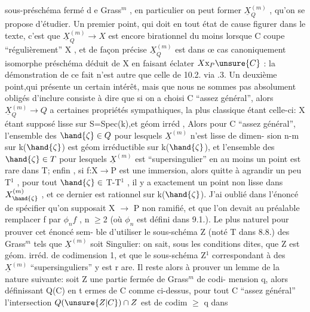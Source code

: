 
sous-préschéma fermé d e Grass$^{m}$ , en particulier on peut former $\underline{X}^{(m)}_{Q}$ ,
qu'on se propose d'étudier. Un premier point, qui doit en tout état de
cause figurer dans le texte, c'est que $\underline{X}^{(m)}_{Q} \longrightarrow X$ est encore birationnel
du moins lorsque C coupe ``régulièrement'' X , et de façon précise $\underline{X}^{(m)}_{Q}$
est dans œ cas canoniquement isomorphe  préschéma déduit de X en
faisant éclater $X\mathrm{x}_{P}\unsure{C}$ : la démonstration de ce fait n'est autre que celle
de 10.2. via .3. Un deuxième point,qui présente un certain intérêt,
mais que nous ne sommes pas absolument obligés d'inclure consiste à
dire que si on a choisi C ``assez général'', alors $\underline{X}^{(m)}_{Q} \longrightarrow Q$ a certaines
propriétés sympathiques, la plus classique étant celle-ci: X étant
supposé lisse sur S=Spec(k),et  géom irréd , Alors pour C ``assez
général'', l'ensemble des $\hand{\zeta}\in Q$ pour lesquels $\underline{X}^{(m)}$ n'est lisse de dimen-%
sion n-m sur k($\hand{\zeta}$) est géom irréductible sur k($\hand{\zeta}$), et 
l'ensemble des $\hand{\zeta}\in T$ pour lesquels $\underline{X}^{(m)}$ est ``supersingulier'' en au
moins un point est rare dans T;
 enfin , si f:X$\rightarrow$P est une immersion, alors
quitte à agrandir un peu T$^{1}$ , pour tout $\hand{\zeta}\in$ T-T$^{1}$ , il y a exactement un
\margin{$|$}point non lisse dans $X^{(m)}_{\hand{\zeta}}$ , et ce dernier est rationnel sur k($\hand{\zeta}$). J'ai
oublié dans l'énoncé de spécifier qu'on supposait X  $\longrightarrow$ P non ramifié,
et que l'on devait au préalable remplacer f par $\phi_{n}f$ , n $\geq$2 (où $\phi_{n}$ est
défini dans 9.1.). Le plus naturel  pour prouver cet énoncé sem-%
ble d'utiliser le sous-schéma Z (noté T dans 8.8.) des Grass$^{m}$ tels
que $\underline{X}^{(m)}$ soit Singulier: on sait, sous les conditions dites, que Z
est géom. irréd. de codimension 1, et que le sous-schéma Z$^{1}$ correspondant
à des $\underline{X}^{(m)}$ ``supersinguliers'' y est r are. Il reste alors à prouver un
lemme de la nature suivante: soit Z une partie fermée de Grass$^{m}$ de codi-%
mension q, alors définissant Q(C) en t ermes de C comme ci-dessus, pour
tout C ``assez général'' l'intersection $Q(\unsure{Z|C})\cap Z$ est de codim $\geq$ q dans

